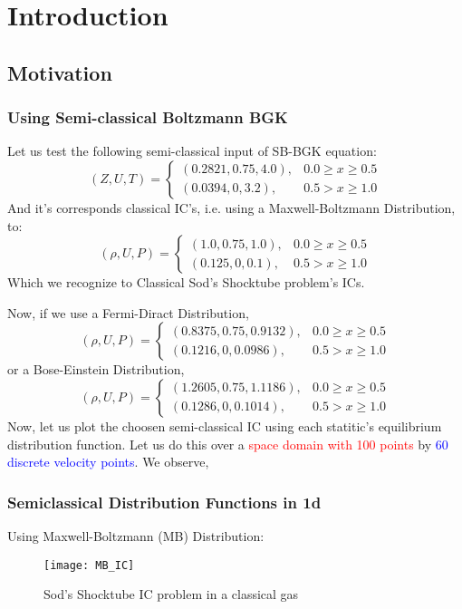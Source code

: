 \section{Introduction}
	\subsection{Motivation}
	
\begin{frame}
	\frametitle{Using Semi-classical Boltzmann BGK}
	Let us test the following semi-classical input of SB-BGK equation:
	\[
		(Z,U,T) = 
		\begin{cases}
		(0.2821,0.75,4.0), 	&	0.0 \geq x \geq 0.5 \\
		(0.0394,0,3.2),			& 0.5 > x \geq 1.0
		\end{cases}
	\]
	And it's corresponds classical IC's, i.e. using a Maxwell-Boltzmann Distribution, to:
	\[
		(\rho,U,P) = 
		\begin{cases}
		(1.0,0.75,1.0), &	0.0 \geq x \geq 0.5 \\
		(0.125,0,0.1),	& 0.5 > x \geq 1.0
		\end{cases}
	\]
	Which we recognize to Classical Sod's Shocktube problem's ICs.
\end{frame}

\begin{frame}
	Now, if we use a Fermi-Diract Distribution,
	\[
		(\rho,U,P) = 
		\begin{cases}
		(0.8375,0.75,0.9132), &	0.0 \geq x \geq 0.5 \\
		(0.1216,0,0.0986),		& 0.5 > x \geq 1.0
		\end{cases}
	\]
	or a Bose-Einstein Distribution,
	\[
		(\rho,U,P) = 
		\begin{cases}
		(1.2605,0.75,1.1186), &	0.0 \geq x \geq 0.5 \\
		(0.1286,0,0.1014),		& 0.5 > x \geq 1.0
		\end{cases}
	\]
Now, let us plot the choosen semi-classical IC using each statitic's equilibrium distribution function. Let us do this over a \textcolor{red}{space domain with 100 points} by \textcolor{blue}{60 discrete velocity points}. We observe,
\end{frame}
	
\begin{frame}
	\frametitle{Semiclassical Distribution Functions in 1d}
	Using Maxwell-Boltzmann (MB) Distribution:
	\begin{figure}[p1]
	\centering
	\texttt{[image: MB\_IC]}%
	\caption{Sod's Shocktube IC problem in a classical gas}
	\end{figure}
\end{frame}

